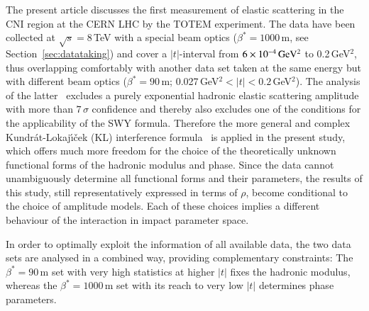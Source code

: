 The present article discusses the first measurement of elastic scattering in the
CNI region at the CERN LHC by the TOTEM experiment. 
The data have been collected at $\sqrt{s} = 8\,$TeV with a special beam optics 
($\beta^{*}=1000\,$m, see Section~\ref{sec:datataking}) and cover a $|t|$-interval
from $6\times10^{-4}\,\rm GeV^{2}$ to 0.2\,GeV$^{2}$, thus overlapping comfortably
with another data set taken at the same energy but with different beam optics
($\beta^{*}=90\,$m; 0.027\,GeV$^{2} < |t| < 0.2\,$GeV$^{2}$). The analysis of the
latter~\cite{8tev-90m} excludes a purely exponential hadronic elastic scattering
amplitude with more than $7\,\sigma$ confidence and thereby also excludes
one of the conditions for the applicability of the SWY formula.
Therefore the more general and complex Kundr\'{a}t-Lokaj\'{\i}\v{c}ek (KL) interference 
formula~\cite{kl94} is applied in the present study, which offers much more freedom for the
choice of the theoretically unknown functional forms of the hadronic modulus 
and phase. Since the data cannot unambiguously determine all functional forms and their parameters, the results of this study, still representatively 
expressed in terms of $\rho$, become conditional to the choice of amplitude models. Each of these choices implies a different behaviour of the interaction 
in impact parameter space.

In order to optimally exploit the information of all available data, the two 
data sets are analysed in a combined way, providing complementary constraints:
The $\beta^{*}=90\,$m set with very high statistics at higher $|t|$ fixes the 
hadronic modulus, whereas the $\beta^{*}=1000\,$m set with its reach to very low
$|t|$ determines phase parameters.




%
%
